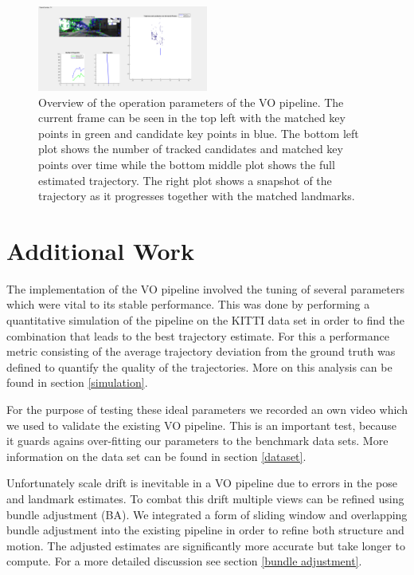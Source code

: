 \begin{figure}[H]
  \centering
    \includegraphics[width=0.5\textwidth]{figures/overview}
  \caption{Overview of the operation parameters of the VO pipeline. 
  The current frame can be seen in the top left with the matched key points in green and candidate key points in blue. 
  The bottom left plot shows the number of tracked candidates and matched key points over time while the bottom middle plot shows the full estimated trajectory. 
  The right plot shows a snapshot of the trajectory as it progresses together with the matched landmarks.}
  \label{fig:overview}
\end{figure}

\section{Additional Work}
\label{additionalWork}
The implementation of the VO pipeline involved the tuning of several parameters which were vital to its stable performance. 
This was done by performing a quantitative simulation of the pipeline on the KITTI data set in order to find the combination that leads to the best trajectory estimate. 
For this a performance metric consisting of the average trajectory deviation from the ground truth was defined to quantify the quality of the trajectories. 
More on this analysis can be found in section \ref{simulation}. \par
For the purpose of testing these ideal parameters we recorded an own video which we used to validate the existing VO pipeline. 
This is an important test, because it guards agains over-fitting our parameters to the benchmark data sets. 
More information on the data set can be found in section \ref{dataset}. \par
Unfortunately scale drift is inevitable in a VO pipeline due to errors in the pose and landmark estimates. 
To combat this drift multiple views can be refined using bundle adjustment (BA). 
We integrated a form of sliding window and overlapping bundle adjustment into the existing pipeline in order to refine both structure and motion. 
The adjusted estimates are significantly more accurate but take longer to compute. 
For a more detailed discussion see section \ref{bundle adjustment}.